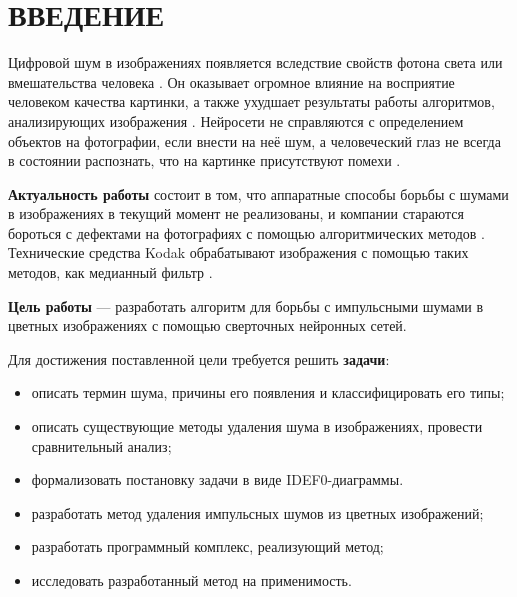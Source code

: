 \section*{ВВЕДЕНИЕ}
Цифровой шум в изображениях появляется вследствие свойств фотона света или вмешательства человека \cite{shum}.
Он оказывает огромное влияние на восприятие человеком качества картинки, а также ухудшает результаты работы алгоритмов, анализирующих изображения \cite{software}. 
Нейросети не справляются с определением объектов на фотографии, если внести на неё шум, а человеческий глаз не всегда в состоянии распознать, что на картинке присутствуют помехи \cite{nn1s}.

\textbf{Актуальность работы} состоит в том, что аппаратные способы борьбы с шумами в изображениях в текущий момент не реализованы, и компании стараются бороться с дефектами на фотографиях с помощью алгоритмических методов \cite{software}. 
Технические средства Kodak обрабатывают изображения с помощью таких методов, как медианный фильтр \cite{kodak}.

\textbf{Цель работы} --- разработать алгоритм для борьбы с импульсными шумами в цветных изображениях с помощью сверточных нейронных сетей.

Для достижения поставленной цели требуется решить \textbf{задачи}:
\begin{itemize}
	\item описать термин шума, причины его появления и классифицировать его типы;
	\item описать существующие методы удаления шума в изображениях, провести сравнительный анализ;
	\item формализовать постановку задачи в виде IDEF0-диаграммы.
	\item разработать метод удаления импульсных шумов из цветных изображений;
	\item разработать программный комплекс, реализующий метод;
	\item исследовать разработанный метод на применимость.
\end{itemize}